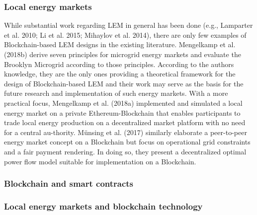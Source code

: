 \subsubsection{Local energy markets}
While substantial work regarding LEM in general has been done (e.g., Lamparter et al. 2010; Li et al. 2015; Mihaylov et al. 2014), there are only few examples of Blockchain-based LEM designs in the existing literature. 
Mengelkamp et al. (2018b) derive seven principles for microgrid energy markets and evaluate the Brooklyn Microgrid according to those principles. According to the authors knowledge, they are the only ones providing a theoretical framework for the design of Blockchain-based LEM and their work may serve as the basis for the future research and implementation of such energy markets.
With a more practical focus, Mengelkamp et al. (2018a) implemented and simulated a local energy market on a private Ethereum-Blockchain  that enables participants to trade local energy production on a decentralized market platform with no need for a central au-thority.
Münsing et al. (2017) similarly elaborate a peer-to-peer energy market concept on a Blockchain but focus on operational grid constraints and a fair payment rendering. In doing so, they present a decentralized optimal power flow model suitable for implementation on a Blockchain.



\subsubsection{Blockchain and smart contracts}



\subsubsection{Local energy markets and blockchain technology}



